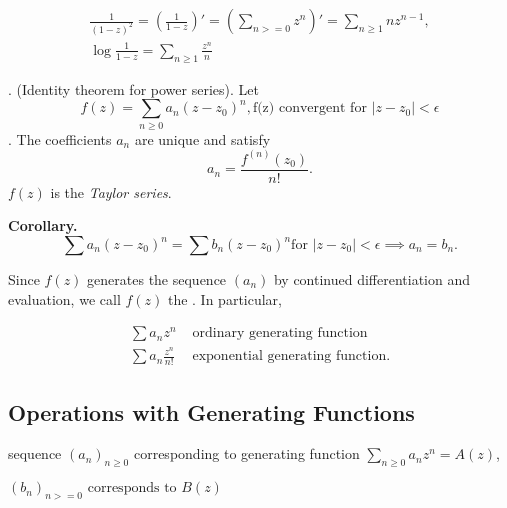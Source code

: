 \begin{gather*}
    \frac1{(1-z)^2}
    = \left(\frac1{1-z}\right)'
    = \left(\sum_{n>=0} z^n\right)'
    = \sum_{n≥1} n z^{n-1}, \\
    \log\frac{1}{1-z} = \sum_{n≥1} \frac{z^n}{n}
\end{gather*}

\Theorem. (Identity theorem for power series).
Let
\[
    f(z) = \sum_{n≥0} a_n (z-z_0)^n,
    \text{f(z) convergent for $|z-z_0| < \epsilon$}
\].
The coefficients $a_n$ are unique and satisfy
\[
    a_n = \frac{f^{(n)}(z_0)}{n!}.
\]
$f(z)$ is the \emph{Taylor series}.

\textbf{Corollary.}
\[
    \sum a_n (z-z_0)^n =
    \sum b_n (z-z_0)^n
    \text{for $|z-z_0| < \epsilon$}
    \implies
    a_n = b_n.
\]

Since $f(z)$ generates the sequence $(a_n)$ by continued differentiation and evaluation, we call $f(z)$ the . In particular,

\begin{align*}
\sum a_n z^n & \text{ ordinary generating function} \\
\sum a_n \frac{z^n}{n!} & \text{ exponential generating function.}
\end{align*}


\subsection*{Operations with Generating Functions}

sequence $(a_n)_{n≥0}$ corresponding to generating function
$\sum_{n≥0} a_n z^n = A(z)$,

$(b_n)_{n>=0} \text{ corresponds to } B(z)$

